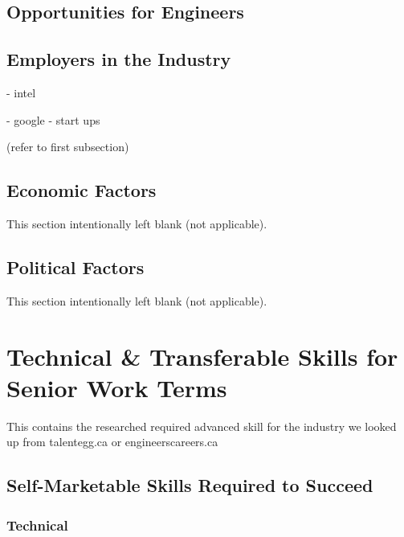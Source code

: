 \documentclass[10pt,letterpaper]{article}
\begin{document}
\subsection{Opportunities for Engineers}

\subsection{Employers in the Industry}

- intel

- google
- start ups

(refer to first subsection)

\subsection{Economic Factors}

\begin{center}
	This section intentionally left blank (not applicable).
\end{center}

\subsection{Political Factors}

\begin{center}
	This section intentionally left blank (not applicable).
\end{center}


\clearpage
\section{Technical \& Transferable Skills for Senior Work Terms}\label{transferable-skills}




This contains the researched required advanced skill for the industry we looked up from talentegg.ca or engineerscareers.ca

\subsection{Self-Marketable Skills Required to Succeed}
\subsubsection{Technical}
\end{document}
